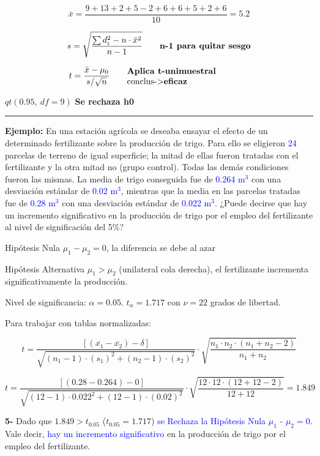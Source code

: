 \documentclass[10pt,a4paper]{article}
\begin{document}
\[
\bar{x} = \frac{9 + 13 + 2 + 5 - 2 + 6 + 6 + 5 + 2 + 6}{10} = 5.2
\]

\[
s = \sqrt{\frac{\sum d_i^2 - n \cdot \bar{x}^2}{n-1}}
\qquad \text{\textbf{n-1 para quitar sesgo}}
\]

\[
t = \frac{\bar{x} - \mu_0}{s/\sqrt{n}}
\qquad \parbox{5cm}{\textbf{Aplica t-unimuestral}\\ conclus->\textbf{eficaz}}
\]

$qt(0.95,\ df = 9)$ \hspace{2cm} \textbf{Se rechaza h0}

\vspace{4pt}
\hrule
\vspace{4pt}

\textbf{Ejemplo:} En una estación agrícola se deseaba ensayar el efecto de un determinado fertilizante sobre la producción de trigo. Para ello se eligieron \textcolor{blue}{24} parcelas de terreno de igual superficie; la mitad de ellas fueron tratadas con el fertilizante y la otra mitad no (grupo control). Todas las demás condiciones fueron las mismas. La media de trigo conseguida fue de \textcolor{blue}{0.264 m$^3$} con una desviación estándar de \textcolor{blue}{0.02 m$^3$}, mientras que la media en las parcelas tratadas fue de \textcolor{blue}{0.28 m$^3$} con una desviación estándar de \textcolor{blue}{0.022 m$^3$}. ¿Puede decirse que hay un incremento significativo en la producción de trigo por el empleo del fertilizante al nivel de significación del 5\%?

\begin{description}[leftmargin=1.4cm,style=nextline,itemsep=1pt,topsep=1pt,parsep=0pt]
  \item[1 --] Hipótesis Nula $\mu_1 - \mu_2 = 0$, la diferencia se debe al azar

  Hipótesis Alternativa $\mu_1 > \mu_2$ (unilateral cola derecha), el fertilizante incrementa significativamente la producción.
  \item[2 -] Nivel de significancia: $\alpha = 0.05$. $t_\alpha = 1.717$ con $\nu = 22$ grados de libertad.
  \item[3 -] Para trabajar con tablas normalizadas:
\end{description}

\[
t = \frac{\left[\left(\overline{x_1} - \overline{x_2}\right) - \delta\right]}{\sqrt{(n_1-1)\cdot(s_1)^2 + (n_2-1)\cdot(s_2)^2}} \cdot \sqrt{\frac{n_1 \cdot n_2 \cdot (n_1+n_2-2)}{n_1+n_2}}
\]

\[
t = \frac{\left[(0.28 - 0.264) - 0\right]}{\sqrt{(12-1)\cdot 0.022^2 + (12-1)\cdot(0.02)^2}} \cdot \sqrt{\frac{12 \cdot 12 \cdot (12+12-2)}{12+12}} = 1.849
\]

\textbf{5-} Dado que $1.849 > t_{0.05}$ ($t_{0.05} = 1.717$) \textcolor{blue}{se Rechaza la Hipótesis Nula $\mu_1$ - $\mu_2 = 0$}. Vale decir, \textcolor{blue}{hay un incremento significativo} en la producción de trigo por el empleo del fertilizante.
\end{document}
